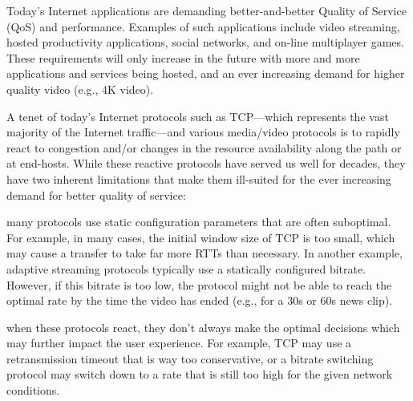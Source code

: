 


Today's Internet applications are demanding better-and-better Quality of Service (QoS) and performance. Examples of such applications include video streaming, hosted productivity applications, social networks, and on-line multiplayer games. These requirements will only increase in the future with more and more applications and services being hosted, and an ever increasing demand for higher quality video (e.g., 4K video).

A tenet of today's Internet protocols such as TCP---which represents the vast majority of the Internet traffic---and various media/video protocols is to rapidly react to congestion and/or changes in the resource availability along the path or at end-hosts. While these reactive protocols have served us well for decades, they have two inherent limitations that make them ill-suited for the ever increasing demand for better quality of service: 

 many protocols use static configuration parameters that are often suboptimal. For example, in many cases, the initial window size of TCP is too small, which may cause a transfer to take far more RTTs than necessary. In another example, adaptive streaming protocols typically use a statically configured bitrate. However, if this bitrate is too low, the protocol might not be able to reach the optimal rate by the time the video has ended (e.g., for a 30s or 60s news clip). 

 when these protocols react, they don't always make the optimal decisions which may further impact the user experience. For example, TCP may use a retransmission timeout that is way too conservative, or a bitrate switching protocol may switch down to a rate that is still too high for the given network conditions.

